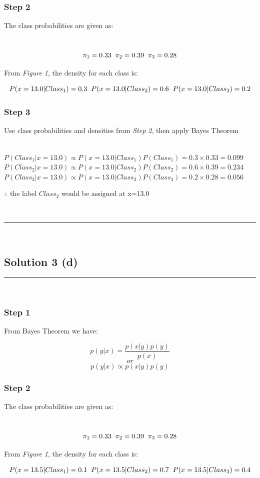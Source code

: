 \documentclass{article}
\begin{document}
\subsubsection*{Step 2}
\parbox{\textwidth}{The class probabilities are given as: }\\
$$\pi_1 = 0.33 \hspace{0.2cm} \pi_2 = 0.39 \hspace{0.2cm} \pi_3 = 0.28$$
\parbox{\textwidth}{From \textit{Figure 1}, the density for each class is:}
$$P(x=13.0|Class_1) = 0.3 \hspace{0.2cm} P(x=13.0|Class_2) = 0.6 \hspace{0.2cm} P(x=13.0|Class_3) = 0.2$$

\subsubsection*{Step 3}

\parbox{\textwidth}{Use class probabilities and densities from \textit{Step 2}, then apply Bayes Theorem}\\

$P(Class_1|x=13.0) \propto P(x=13.0|Class_1)P(Class_1) = 0.3 \times 0.33 = 0.099$\\

$P(Class_2|x=13.0) \propto P(x=13.0|Class_2)P(Class_2) = 0.6 \times 0.39 = 0.234$\\

$P(Class_3|x=13.0) \propto P(x=13.0|Class_3)P(Class_3) = 0.2 \times 0.28 = 0.056$\\

\parbox{\textwidth}{$\therefore$ the label $Class_2$ would be assigned at x=13.0}\\

\noindent\rule{\textwidth}{0.4pt}\\
\newpage
\subsection*{Solution 3 (d)}

\noindent\rule{\textwidth}{0.4pt}\\

\subsubsection*{Step 1}
\parbox{\textwidth}{From Bayes Theorem we have:}
$$p(y|x) = \frac{p(x|y)p(y)}{p(x)}$$
$$or$$
$$p(y|x) \propto p(x|y)p(y)$$

\subsubsection*{Step 2}
\parbox{\textwidth}{The class probabilities are given as: }\\
$$\pi_1 = 0.33 \hspace{0.2cm} \pi_2 = 0.39 \hspace{0.2cm} \pi_3 = 0.28$$
\parbox{\textwidth}{From \textit{Figure 1}, the density for each class is:}
$$P(x=13.5|Class_1) = 0.1 \hspace{0.2cm} P(x=13.5|Class_2) = 0.7 \hspace{0.2cm} P(x=13.5|Class_3) = 0.4$$
\end{document}
